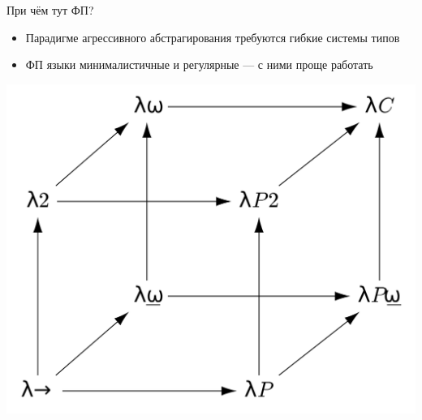     \begin{frame}{При чём тут ФП? \popslide}
        \begin{itemize}
            \item Парадигме агрессивного абстрагирования требуются гибкие системы типов
            \item ФП языки минималистичные и регулярные --- с ними проще работать
        \end{itemize}
        \begin{center}
            \includegraphics[height=0.6\textheight]{figs/cube}
        \end{center}
    \end{frame}



